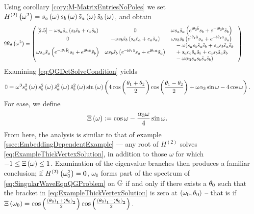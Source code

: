 Using corollary \ref{cory:M-MatrixEntriesNoPoles} we set $H^{(2)}\left( \omega^2 \right) = s_a\left( \omega \right) s_b\left( \omega \right) \tilde{s}_a\left( \omega \right) \tilde{s}_b\left( \omega \right)$, and obtain
\begin{align*}
	\mathfrak{M}_{\theta}\left( \omega^2 \right) &=
	\begin{pmatrix}[2.5]
		-\omega s_a \tilde{s}_a \left(  s_b \tilde{c}_b + c_b \tilde{s}_b  \right) &
		0 &
		\begin{split}
			&\omega s_a \tilde{s}_a \left(  e^{\mathrm{i}\theta_2\tilde{b}}s_b + e^{-\mathrm{i}\theta_2 b}\tilde{s}_b  \right)
		\end{split} \\
		0 &
		-\omega s_b \tilde{s}_b \left(  s_a \tilde{c}_a + c_a \tilde{s}_a  \right) &
		\begin{split}
			&\omega s_b \tilde{s}_b \left(  e^{\mathrm{i}\theta_1\tilde{a}}s_a + e^{-\mathrm{i}\theta_1 a}\tilde{s}_a  \right) 
		\end{split} \\
		\omega s_a \tilde{s}_a \left(  e^{-\mathrm{i}\theta_2\tilde{b})}s_b + e^{\mathrm{i}\theta_2 b}\tilde{s}_b  \right) &
		\omega s_b \tilde{s}_b \left(  e^{-\mathrm{i}\theta_1\tilde{a}}s_a + e^{\mathrm{i}\theta_1 a}\tilde{s}_a  \right) &
		\begin{split}
			&-\omega ( s_a s_b \tilde{s}_a \tilde{c}_b 
			+ s_a s_b \tilde{c}_a \tilde{s}_b \\ 
			& + s_a c_b \tilde{s}_a \tilde{s}_b
			+ c_a s_b \tilde{s}_a \tilde{s}_b \\
			& - \omega\alpha_3 s_a s_b \tilde{s}_a \tilde{s}_b )
		\end{split}
	\end{pmatrix}.
\end{align*}
Examining \eqref{eq:QGDetSolveCondition} yields
\begin{align} \label{eq:ExampleThickVertexSolution}
	0 = \omega^3 s_a^2\left( \omega \right) s_b^2\left( \omega \right) \tilde{s}_a^2\left( \omega \right) \tilde{s}_b^2\left( \omega \right) \sin\left( \omega \right) 
	\left(  4\cos\left( \frac{\theta_1+\theta_2}{2} \right)\cos\left( \frac{\theta_1-\theta_2}{2} \right) + \omega\alpha_3\sin\omega - 4\cos\omega \right).
\end{align}
For ease, we define
\begin{align*}
	\Xi\left( \omega \right) := \cos\omega - \frac{\alpha_3\omega}{4}\sin\omega.
\end{align*}
From here, the analysis is similar to that of example \ref{ssec:EmbeddingDependentExample} --- any root of $H^{(2)}$ solves \eqref{eq:ExampleThickVertexSolution}, in addition to those $\omega$ for which $-1\leq\Xi\left( \omega \right)\leq 1$.
Examination of the eigenvalue branches then produces a familiar conclusion; if $H^{(2)}\left( \omega_0^2 \right)=0$, $\omega_0$ forms part of the spectrum of \eqref{eq:SingularWaveEqnQGProblem} on $\mathbb{G}$ if and only if there exists a $\theta_0$ such that the bracket in \eqref{eq:ExampleThickVertexSolution} is zero at $\left( \omega_0,\theta_0 \right)$ -- that is if $\Xi\left( \omega_0 \right) = \cos\left( \frac{\left( \theta_0 \right)_1+\left( \theta_0 \right)_2}{2} \right)\cos\left( \frac{\left( \theta_0 \right)_1-\left( \theta_0 \right)_2}{2} \right)$.
